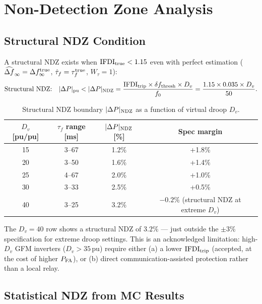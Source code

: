 \documentclass[11pt, a4paper]{article}
\newcommand{\dfhat}{\widehat{\Delta f}_\infty}
\newcommand{\taufhat}{\hat{\tau}_f}
\newcommand{\IFDI}{\mathrm{IFDI}}
\newcommand{\Wtau}{W_\tau}
\begin{document}
\section{Non-Detection Zone Analysis}
\label{sec:ndz}

\subsection{Structural NDZ Condition}

A structural NDZ exists when $\IFDI_{\rm true} < 1.15$ even with perfect
estimation ($\dfhat = \Delta f_\infty^{\rm true}$, $\taufhat = \tau_f^{\rm
true}$, $\Wtau = 1$):
\begin{equation}
  \text{Structural NDZ:}\quad
  |\Delta P|_{\rm pu} < |\Delta P|_{\rm NDZ}
  = \frac{\IFDI_{\rm trip} \times \delta f_{\rm thresh} \times D_v}{f_0}
  = \frac{1.15 \times 0.035 \times D_v}{50}.
\end{equation}

\begin{table}[h]
\centering
\caption{Structural NDZ boundary $|\Delta P|_{\rm NDZ}$ as a function of
         virtual droop $D_v$.}
\label{tab:ndz}
\begin{tabular}{cccc}
\toprule
$D_v$ [pu/pu] & $\tau_f$ range [ms] & $|\Delta P|_{\rm NDZ}$ [\%] & Spec margin \\
\midrule
15  & 3--67   & 1.2\%  & +1.8\%  \\
20  & 3--50   & 1.6\%  & +1.4\%  \\
25  & 4--67   & 2.0\%  & +1.0\%  \\
30  & 3--33   & 2.5\%  & +0.5\%  \\
40  & 3--25   & 3.2\%  & $-0.2\%$ (structural NDZ at extreme $D_v$) \\
\bottomrule
\end{tabular}
\end{table}

The $D_v = 40$ row shows a structural NDZ of $3.2\%$ — just outside the
$\pm 3\%$ specification for extreme droop settings.  This is an acknowledged
limitation: high-$D_v$ GFM inverters ($D_v > 35\,\text{pu}$) require either
(a) a lower $\IFDI_{\rm trip}$ (accepted, at the cost of higher $P_{\rm FA}$),
or (b) direct communication-assisted protection rather than a local relay.

\subsection{Statistical NDZ from MC Results}
\end{document}
